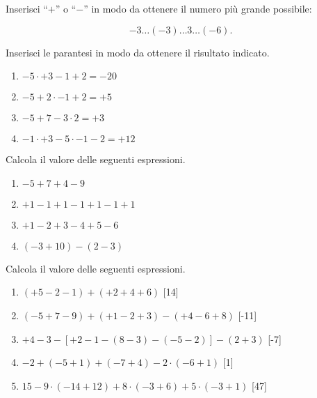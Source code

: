 \begin{esercizio}
Inserisci ``\(+\)'' o ``\(-\)'' in modo da ottenere il numero più grande 
possibile:

\vspace{-.5em}
 \[-3\ldots(-3)\ldots3\ldots(-6).\]
\end{esercizio}

\begin{esercizio}
Inserisci le parantesi in modo da ottenere il risultato indicato.

\vspace{-.5em}
 \begin{multicols}{2}
 \begin{enumerate}[noitemsep, label=(\alph*)]
 \item \(-5 \cdot +3-1+2=-20\)
 \item \(-5+2\cdot-1+2=+5\)
 \item \(-5+7-3\cdot 2=+3\)
 \item \(-1\cdot +3-5\cdot -1-2=+12\)
 \end{enumerate}
 \end{multicols}
\end{esercizio}

\begin{esercizio}
Calcola il valore delle seguenti espressioni.

\vspace{-.5em}
 \begin{multicols}{2}
 \begin{enumerate}[noitemsep, label=(\alph*)]
 \item \(-5+7+4-9\)
 \item \(+1-1+1-1+1-1+1\)
 \item \(+1-2+3-4+5-6\)
 \item \((-3+10)-(2-3)\)
 \end{enumerate}
 \end{multicols}
\end{esercizio}

\begin{esercizio} %
Calcola il valore delle seguenti espressioni.
 \begin{enumerate}[noitemsep, label=(\alph*)]
 \item \((+5-2-1)+(+2+4+6)\) \hfill[14]
 \item \((-5+7-9)+(+1-2+3)-(+4-6+8)\) \hfill[-11]
 \item \(+4-3-[+2-1-(8-3)-(-5-2)]-(2+3)\) \hfill[-7]
 \item \(-2+(-5+1)+(-7+4)-2 \cdot (-6+1)\) \hfill[1]
 \item \(15-9 \cdot (-14+12)+8 \cdot (-3+6)+ 5 \cdot(-3+1)\) \hfill[47]
 \end{enumerate}
\end{esercizio}


